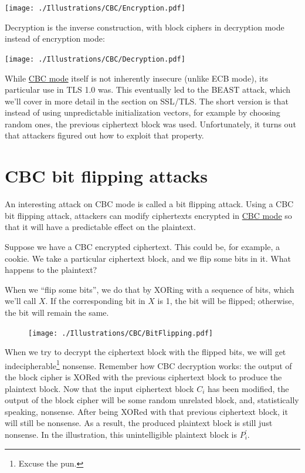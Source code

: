 \documentclass[11pt,ebook,table,dvipsnames]{memoir}
\begin{document}
\texttt{[image: ./Illustrations/CBC/Encryption.pdf]}

Decryption is the inverse construction, with block ciphers in
decryption mode instead of encryption mode:

\texttt{[image: ./Illustrations/CBC/Decryption.pdf]}

While \hyperref[CBC-mode]{CBC mode} itself is not inherently insecure (unlike ECB mode),
its particular use in TLS 1.0 was. This eventually led to the
\gls{BEAST} attack, which we'll cover in more detail in the section on
SSL/TLS. The short version is that instead of using unpredictable
\glspl{initialization vector}, for example by choosing random ones,
the previous ciphertext block was used. Unfortunately, it turns out
that attackers figured out how to exploit that property.
\section{\label{CBC-bit-flipping-attacks}CBC bit flipping attacks}
\label{sec-2-3-5}

An interesting attack on \gls{CBC mode} is called a bit flipping
attack. Using a CBC bit flipping attack, attackers can modify
ciphertexts encrypted in \hyperref[CBC-mode]{CBC mode} so that it will have a predictable
effect on the plaintext.

Suppose we have a CBC encrypted ciphertext. This could be, for
example, a cookie. We take a particular ciphertext block, and we flip
some bits in it. What happens to the plaintext?

When we \enquote{flip some bits}, we do that by XORing with a sequence of
bits, which we'll call $X$. If the corresponding bit in $X$ is 1, the
bit will be flipped; otherwise, the bit will remain the same.

\begin{figure}[h!]
\centering
\texttt{[image: ./Illustrations/CBC/BitFlipping.pdf]}
\end{figure}

When we try to decrypt the ciphertext block with the flipped bits, we
will get indecipherable\footnote{Excuse the pun.} nonsense. Remember how
CBC decryption works: the output of the block cipher is XORed with the
previous ciphertext block to produce the plaintext block. Now that the
input ciphertext block $C_i$ has been modified, the output of the
block cipher will be some random unrelated block, and, statistically
speaking, nonsense. After being XORed with that previous ciphertext
block, it will still be nonsense. As a result, the produced plaintext
block is still just nonsense. In the illustration, this unintelligible
plaintext block is $P_i^{\prime}$.
\end{document}
